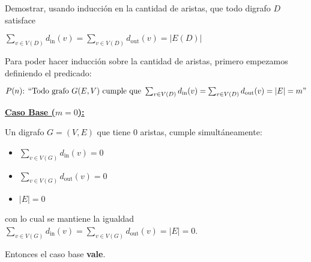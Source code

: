 \documentclass[12pt,a4paper]{article}
\begin{document}
\par Demostrar, usando inducción en la cantidad de aristas, que todo digrafo \ensuremath{D} satisface
\demoline

\begin{math}
  \displaystyle
  \sum_{v \in V(D)} d_{\text{in}}(v)
  = \sum_{v \in V(D)} d_{\text{out}}(v)
  = |E(D)|
\end{math}

\demoline
\par Para poder hacer inducción sobre la cantidad de aristas, primero empezamos definiendo el predicado:
\demoline
\par \ensuremath{P(n)\text{: } ``\text{Todo grafo } G(E, V) \text{ cumple que } \sum_{v \in V(D)} d_{\text{in}}(v) = \sum_{v \in V(D)} d_{\text{out}}(v) = |E| = m"}
\demoline

\par \underline{\textbf{Caso Base (\ensuremath{m = 0}):}}
\par Un digrafo \ensuremath{G=(V, E)} que tiene 0 aristas, cumple simultáneamente:
\begin{groupIzq}{1em}
  \begin{itemize}
    \item \ensuremath{\sum_{v \in V(G)} d_{\text{in}}(v) = 0}
    \item \ensuremath{\sum_{v \in V(G)} d_{\text{out}}(v) = 0}
    \item \ensuremath{|E| = 0}
  \end{itemize}
\end{groupIzq}
\par con lo cual se mantiene la igualdad \ensuremath{\sum_{v \in V(G)} d_{\text{in}}(v) = \sum_{v \in V(G)} d_{\text{out}}(v) = |E| = 0}.
\par Entonces el caso base \textbf{vale}.

\demoline
\end{document}
